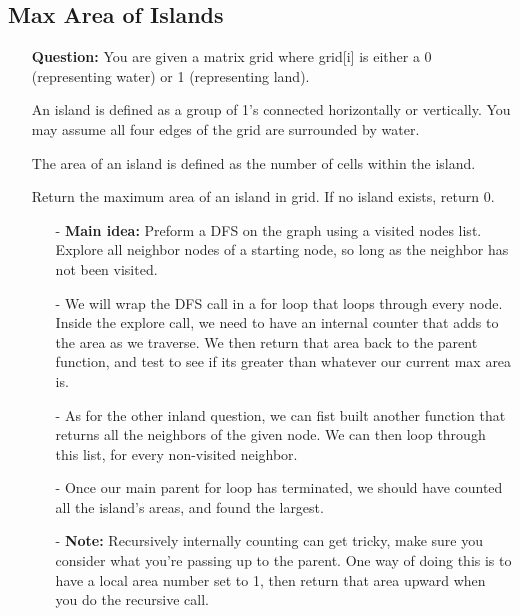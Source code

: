 \documentclass[12pt]{article}
\begin{document}
\subsection{Max Area of Islands}
\begin{enumerate}
  \item[] \textbf{Question:} You are given a matrix grid where grid[i] is either a 0 (representing water) or 1 (representing land).

An island is defined as a group of 1's connected horizontally or vertically. You may assume all four edges of the grid are surrounded by water.

The area of an island is defined as the number of cells within the island.

Return the maximum area of an island in grid. If no island exists, return 0.


    \begin{enumerate}
      \item[-] \textbf{Main idea:} Preform a DFS on the graph using a visited nodes list. Explore all neighbor nodes of a starting node, so long as the neighbor has not been visited. 
      \item[-] We will wrap the DFS call in a for loop that loops through every node. Inside the explore call, we need to have an internal counter that adds to the area as we traverse. We then return that area back to the parent function, and test to see if its greater than whatever our current max area is. 
      \item[-] As for the other inland question, we can fist built another function that returns all the neighbors of the given node. We can then loop through this list, for every non-visited neighbor.
      \item[-] Once our main parent for loop has terminated, we should have counted all the island's areas, and found the largest.
      \item[-] \textbf{Note:} Recursively internally counting can get tricky, make sure you consider what you're passing up to the parent. One way of doing this is to have a local area number set to 1, then return that area upward when you do the recursive call. 
    \end{enumerate}
\end{enumerate}
\end{document}
